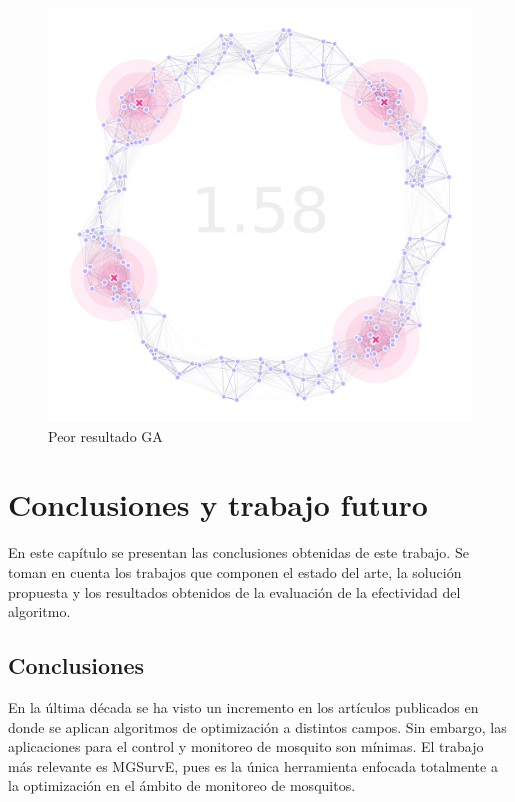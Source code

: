 \documentclass[letterpaper]{report}
\begin{document}
    \begin{figure}[ht!]
      \centering
      \includegraphics[width=\textwidth]{ga-worst.png}
      \caption{Peor resultado GA}
      \label{fig:ga-worst}
    \end{figure}

\chapter{Conclusiones y trabajo futuro}\label{chap:conclusiones}

    En este capítulo se presentan las conclusiones obtenidas de este trabajo. 
    Se toman en cuenta los trabajos que componen el estado del arte, la solución
    propuesta y los resultados obtenidos de la evaluación de la efectividad del
    algoritmo.

    \section{Conclusiones}

    En la última década se ha visto un incremento en los artículos publicados
    en donde se aplican algoritmos de optimización a distintos campos. Sin
    embargo, las aplicaciones para el control y monitoreo de mosquito son
    mínimas. El trabajo más relevante es MGSurvE, pues es la única herramienta
    enfocada totalmente a la optimización en el ámbito de monitoreo de
    mosquitos.
\end{document}
